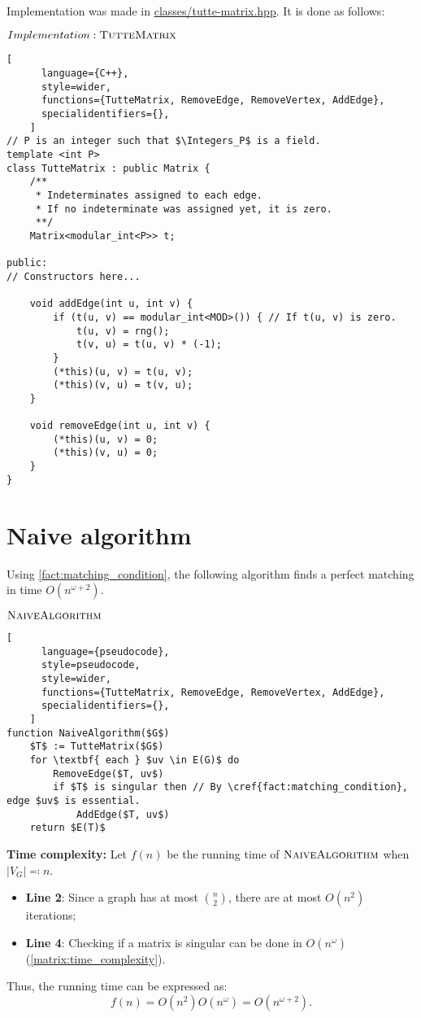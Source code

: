 Implementation was made in \href{https://github.com/antoniomsah/algebraic-max-matching/blob/main/code/classes/tutte-matrix.hpp}{classes/tutte-matrix.hpp}.
It is done as follows:
\begin{programruledcaption}{\(Implementation: \textsc{TutteMatrix}\)}
    \begin{lstlisting}[
      language={C++},
      style=wider,
      functions={TutteMatrix, RemoveEdge, RemoveVertex, AddEdge},
      specialidentifiers={},
    ]
// P is an integer such that $\Integers_P$ is a field.
template <int P>
class TutteMatrix : public Matrix {
    /** 
     * Indeterminates assigned to each edge.
     * If no indeterminate was assigned yet, it is zero.
     **/ 
    Matrix<modular_int<P>> t; 
    
public:
// Constructors here...

    void addEdge(int u, int v) {
        if (t(u, v) == modular_int<MOD>()) { // If t(u, v) is zero.
            t(u, v) = rng();
            t(v, u) = t(u, v) * (-1);
        }
        (*this)(u, v) = t(u, v);
        (*this)(v, u) = t(v, u);
    }

    void removeEdge(int u, int v) {
        (*this)(u, v) = 0;
        (*this)(v, u) = 0;
    }
}
    \end{lstlisting}
\end{programruledcaption}


\section{Naive algorithm}


Using \cref{fact:matching_condition}, the following algorithm finds a perfect matching in time \(O(n^{\omega+2})\).
\begin{programruledcaption}{\(\textsc{NaiveAlgorithm}\)}
    \begin{lstlisting}[
      language={pseudocode},
      style=pseudocode,
      style=wider,
      functions={TutteMatrix, RemoveEdge, RemoveVertex, AddEdge},
      specialidentifiers={},
    ]
function NaiveAlgorithm($G$)
    $T$ := TutteMatrix($G$)
    for \textbf{ each } $uv \in E(G)$ do
        RemoveEdge($T, uv$)
        if $T$ is singular then // By \cref{fact:matching_condition}, edge $uv$ is essential.
            AddEdge($T, uv$)
    return $E(T)$
    \end{lstlisting}
\end{programruledcaption}
\noindent
\textbf{Time complexity:}
Let \(f(n)\) be the running time of \(\textsc{NaiveAlgorithm}\) when \(|V_G| \eqcolon n\).
\begin{itemize}
    \item \textbf{Line 2}: Since a graph has at most \(\binom{n}{2}\), there are at most \(O(n^2)\) iterations;
    \item \textbf{Line 4}: Checking if a matrix is singular can be done in \(O(n^\omega)\) (\cref{matrix:time_complexity}).
\end{itemize}
Thus, the running time can be expressed as:
\[
    f(n) = O(n^2) O(n^\omega) = O(n^{\omega+2}).
\]

